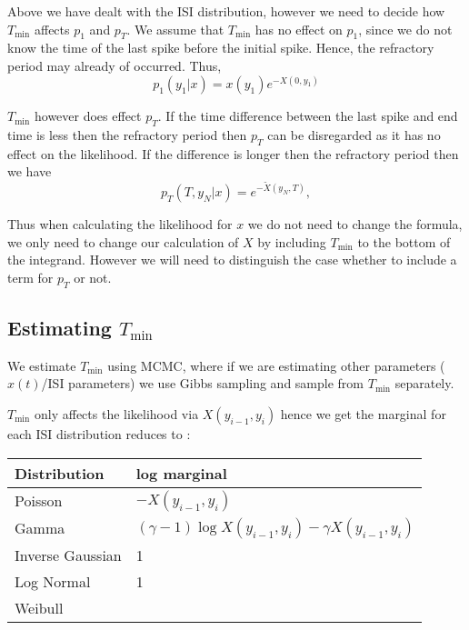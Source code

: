 \documentclass[../main.tex]{subfiles}
\begin{document}
Above we have dealt with the ISI distribution, however we need to decide how $T_{\mathrm{min}}$ affects $p_1$ and $p_T$. We assume that $T_{\mathrm{min}}$ has no effect on $p_1$, since we do not know the time of the last spike before the initial spike. Hence, the refractory period may already of occurred.
Thus, 
\begin{equation}
p_1(y_1|x) = x(y_1)e^{-X(0,y_1)}  
\end{equation}

$T_{\mathrm{min}}$ however does effect $p_T$. If the time difference between the last spike and end time is less then the refractory period then $p_T$ can be disregarded as it has no effect on the likelihood. If the difference is longer then the refractory period then we have 
\begin{equation}
p_T(T,y_N|x) = e^{-\tilde X(y_N,T)}, 
\end{equation}

Thus when calculating the likelihood for $x$ we do not need to change the formula, we only need to change our calculation of $X$ by including $T_{\mathrm{min}}$ to the bottom of the integrand. However we will need to distinguish the case whether to include a term for $p_T$ or not. 

\subsection{Estimating $T_{\mathrm{min}}$}
We estimate $T_{\mathrm{min}}$ using MCMC, where if we are estimating other parameters ($x(t)$/ISI parameters) we use Gibbs sampling and sample from $T_{\mathrm{min}}$ separately.  

$T_{\mathrm{min}}$ only affects the likelihood via $X(y_{i-1},y_i)$ hence we get the
marginal for each ISI distribution reduces to : \\


\begin{tabular}{ll}
Distribution & log marginal \\ \hline
Poisson & $-X(y_{i-1},y_i)$ \\
Gamma & $(\gamma - 1) \log X(y_{i-1},y_i) - \gamma X(y_{i-1},y_i)$ \\
Inverse Gaussian & 1 \\ 
Log Normal & 1 \\
Weibull  & \\
\end{tabular} 
\end{document}
